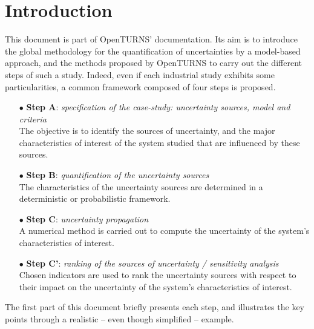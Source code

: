 \section{Introduction}

This document is part of OpenTURNS' documentation. Its aim is to introduce the global methodology for the quantification of uncertainties by a model-based approach, and the methods proposed by OpenTURNS to carry out the different steps of such a study. Indeed, even if each industrial study exhibits some particularities, a common framework composed of four steps is proposed.

\begin{itemize}

\item[$\bullet$] {\bf Step A}: {\em specification of the case-study: uncertainty sources, model and criteria} \\
  The objective is to identify the sources of uncertainty, and the major characteristics of interest of the system studied that are influenced by these sources.
\item[$\bullet$] {\bf Step B}: {\em quantification of the uncertainty sources } \\
  The characteristics of the uncertainty sources are determined in a deterministic or probabilistic framework.
\item[$\bullet$] {\bf Step C}: {\em uncertainty propagation} \\
  A numerical method is carried out to compute the uncertainty of the system's characteristics of interest.
\item[$\bullet$] {\bf Step C'}: {\em ranking of the sources of uncertainty / sensitivity analysis} \\
  Chosen indicators are used to rank the uncertainty sources with respect to their impact on the uncertainty of the system's characteristics of interest.

\end{itemize} \vspace{2mm}

The first part of this document briefly presents each step, and illustrates the key points through a realistic -- even though simplified -- example.

